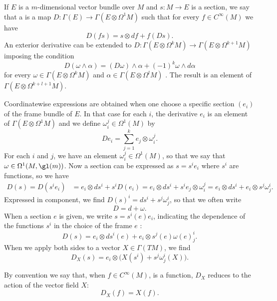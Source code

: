 If $E$ is a $m$-dimensional vector bundle over $M$ and $s\colon M\to E$ is a section, we say that a  is a map $D\colon \Gamma(E)\to \Gamma(E\otimes \Omega^1M)$ such that for every $f\in C^{\infty}(M)$ we have
\[ 
  D(fs)=s\otimes df+f(Ds).
\]
An exterior derivative can be extended to $D\colon \Gamma(E\otimes\Omega^kM)\to \Gamma(E\otimes\Omega^{k+1}M)$ imposing the condition
\begin{equation}		\label{EqExtExtDerrk}
D(\omega\wedge\alpha)=(D\omega)\wedge\alpha+(-1)^k\omega\wedge d\alpha
\end{equation}
for every $\omega\in\Gamma(E\otimes\Omega^kM)$ and $\alpha\in\Gamma(E\otimes\Omega^lM)$ . The result is an element of $\Gamma(E\otimes\Omega^{k+l+1}M)$.

Coordinatewise expressions are obtained when one choose a specific section $(e_i)$ of the frame bundle of $E$. In that case for each $i$, the derivative $e_i$ is an element of $\Gamma(E\otimes\Omega^1M)$ and we define $\omega_i^j\in\Omega^1(M)$ by
\begin{equation}
De_i=\sum_{j=1}^ke_j\otimes \omega_i^j.
\end{equation}
For each $i$ and $j$, we have an element $\omega_i^j\in\Omega^1(M)$, so that we say that $\omega\in\Omega^1(M,\gl(m))$. Now a section can be expressed as $s=s^ie_i$ where $s^i$ are functions, so we have
\begin{align}
  D(s)=D(s^ie_i)	&=e_i\otimes ds^i+s^iD(e_i)=e_i\otimes ds^i+s^ie_j\otimes \omega_i^j=e_i\otimes ds^i+e_i\otimes s^j\omega_j^i.
\end{align}
Expressed in component, we find $D(s)^i=ds^i+s^j\omega_j^i$, so that we often write
\begin{equation}
D=d+\omega.
\end{equation}
When a section $e$ is given, we write $s=s^i(e)e_i$, indicating the dependence of the functions $s^i$ in the choice of the frame $e$ :
\[ 
  D(s)=e_i\otimes ds^i(e)+e_i\otimes s^j(e)\omega(e)_j^i.
\]
When we apply both sides to a vector $X\in\Gamma(TM)$, we find
\begin{equation}
D_X(s)=e_i\otimes\Big( X(s^i)+s^j\omega^i_j(X) \Big).
\end{equation}

By convention we say that, when $f\in C^{\infty}(M)$, is a function, $D_X$ reduces to the action of the vector field $X$:
\begin{equation}
  D_X(f)=X(f).
\end{equation}



